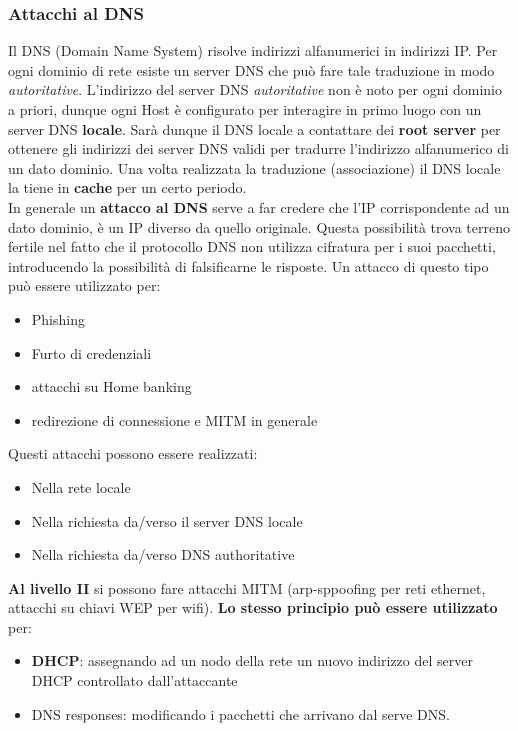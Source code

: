 \documentclass[12pt]{article}
\begin{document}
			\subsubsection{Attacchi al DNS}
				Il DNS (Domain Name System) risolve indirizzi alfanumerici in indirizzi IP. Per ogni dominio di rete esiste un server DNS che può fare tale traduzione in modo \textit{autoritative}. L'indirizzo del server DNS \textit{autoritative} non è noto per ogni dominio a priori, dunque ogni Host è configurato per interagire in primo luogo con un server DNS \textbf{locale}. Sarà dunque il DNS locale a contattare dei \textbf{root server} per ottenere gli indirizzi dei server DNS validi per tradurre l'indirizzo alfanumerico di un dato dominio. Una volta realizzata la traduzione (associazione) il DNS locale la tiene in \textbf{cache} per un certo periodo.\\
				In generale un \textbf{attacco al DNS} serve a far credere che l'IP corrispondente ad un dato dominio, è un IP diverso da quello originale. Questa possibilità trova terreno fertile nel fatto che il protocollo DNS non utilizza cifratura per i suoi pacchetti, introducendo la possibilità di falsificarne le risposte. Un attacco di questo tipo può essere utilizzato per:
				\begin{itemize}
					\item Phishing
					\item Furto di credenziali
					\item attacchi su Home banking 
					\item redirezione di connessione e MITM in generale
				\end{itemize} 
				Questi attacchi possono essere realizzati:
				\begin{itemize}
					\item Nella rete locale
					\item Nella richiesta da/verso il server DNS locale
					\item Nella richiesta da/verso DNS authoritative
				\end{itemize}
				\textbf{Al livello II} si possono fare attacchi MITM (arp-sppoofing per reti ethernet, attacchi su chiavi WEP per wifi). \textbf{Lo stesso principio può essere utilizzato} per:
				\begin{itemize}
					\item \textbf{DHCP}: assegnando ad un nodo della rete  un nuovo indirizzo del server DHCP controllato dall'attaccante
					\item DNS responses: modificando i pacchetti che arrivano dal serve DNS. 				
				\end{itemize} 
\end{document}
